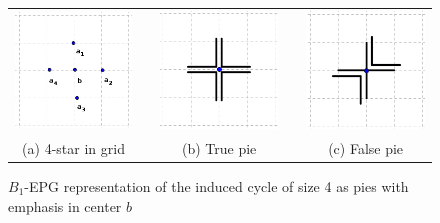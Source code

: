\begin{figure}[htb]
  \centering
  \begin{tabular}{c c c c c }
    \includegraphics[width=4cm]{./img/disposicaoTortaGrid.png}    
    & &\includegraphics[width=4cm]{./img/truePieGrid.png} 
    & &
 \includegraphics[width=4cm]{./img/falsePieGrid.png} \\%
    {\footnotesize (a) 4-star in grid}  & &  {\footnotesize (b) True pie} & & {\footnotesize (c) False pie} %
  \end{tabular}
  \caption{$B_{1}$-EPG representation of the induced cycle of size 4 as pies with emphasis in center $b$}\label{fig:piesInGrid}
\end{figure} 